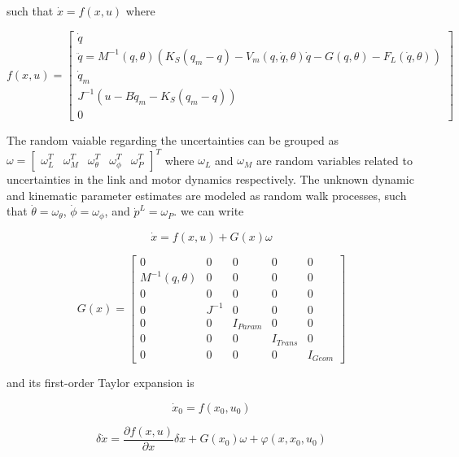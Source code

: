 \documentclass[conference]{IEEEtran}
\begin{document}
such that $\dot x = f(x,u)$ where

\begin{equation}
f(x,u) = \left[ {\begin{array}{*{20}{c}}
{\dot q}\\
{\ddot q = {M^{ - 1}}(q,\theta )({K_S}({q_m} - q) - {V_m}(q,\dot q,\theta )\dot q - G(q,\theta ) - {F_L}(\dot q,\theta ))}\\
{{{\dot q}_m}}\\
{{J^{ - 1}}(u - B{{\dot q}_m} - {K_S}({q_m} - q))}\\
0
\end{array}} \right]
\label{5}
\end{equation}

The random vaiable regarding the uncertainties can be grouped as $\omega  =
{[\begin{array}{*{20}{c}} {\omega _L^T}&{\omega _M^T}&{\omega _\theta ^T}&{\omega _\phi ^T}&{\omega _P^T}
\end{array}]^T}$ where ${\omega _L}$ and ${\omega _M}$ are random variables
related to uncertainties in the link and motor dynamics respectively. The
unknown dynamic and kinematic parameter estimates are modeled as random walk
processes, such that $\dot \theta  = {\omega _\theta }$, $\dot \phi  = {\omega _\phi }$, and ${{\dot p}^L}
= {\omega _P}$. we can write

\begin{equation}
\dot x = f(x,u) + G(x)\omega
\label{6}
\end{equation}

\begin{equation}
G(x) = \left[ {\begin{array}{*{20}{c}}
0&0&0&0&0\\
{{M^{ - 1}}(q,\theta )}&0&0&0&0\\
0&0&0&0&0\\
0&{{J^{ - 1}}}&0&0&0\\
0&0&{{I_{Param}}}&0&0\\
0&0&0&{{I_{Trans}}}&0\\
0&0&0&0&{{I_{Geom}}}
\end{array}} \right]
\label{7}
\end{equation}


and its first-order Taylor expansion is

\begin{equation}
{{\dot x}_0} = f({x_0},{u_0})
\label{8}
\end{equation}

\begin{equation}
\delta \dot x = \frac{{\partial f(x,u)}}{{\partial x}}\delta x +
G({x_0})\omega  + \varphi (x,{x_0},{u_0})
\label{9}
\end{equation}
\end{document}
